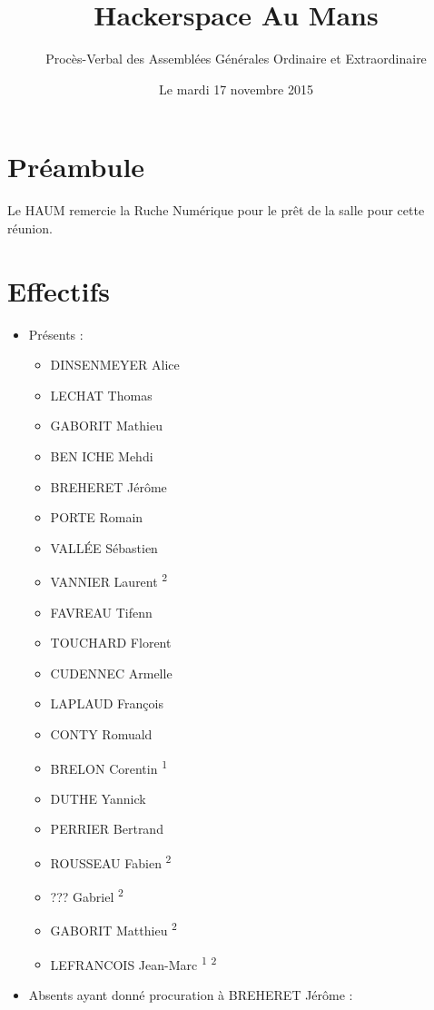 \documentclass[a4paper, 11pt]{article}
\title{Hackerspace Au Mans}
\author{Procès-Verbal des Assemblées Générales Ordinaire et Extraordinaire}
\date{Le mardi 17 novembre 2015}
\begin{document}
\maketitle

\section*{Préambule}

Le HAUM remercie la Ruche Numérique pour le prêt de la salle pour cette réunion.

\section{Effectifs}

\begin{itemize}
	\item Présents : 
		\begin{itemize}
		  \item DINSENMEYER Alice
		  \item LECHAT Thomas
		  \item GABORIT Mathieu
		  \item BEN ICHE Mehdi
		  \item BREHERET Jérôme
		  \item PORTE Romain
		  \item VALLÉE Sébastien
		  \item VANNIER Laurent \textsuperscript{2}
		  \item FAVREAU Tifenn
		  \item TOUCHARD Florent
		  \item CUDENNEC Armelle
		  \item LAPLAUD François
		  \item CONTY Romuald
		  \item BRELON Corentin \textsuperscript{1} 
		  \item DUTHE Yannick
		  \item PERRIER Bertrand 
		  \item ROUSSEAU Fabien \textsuperscript{2}
		  \item ??? Gabriel \textsuperscript{2}
		  \item GABORIT Matthieu \textsuperscript{2}
		  \item LEFRANCOIS Jean-Marc \textsuperscript{1} \textsuperscript{2}
		\end{itemize}
	\item Absents ayant donné procuration à BREHERET Jérôme :
		\begin{itemize}

\end{itemize}
\end{itemize}
\end{document}
